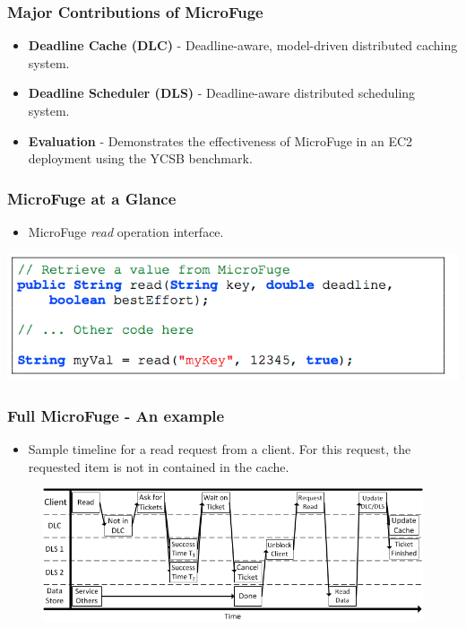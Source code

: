 \documentclass{beamer}
\begin{document}
\begin{frame}
  \frametitle{Major Contributions of MicroFuge}
  \begin{itemize}
    \item \textbf{Deadline Cache (DLC)} - Deadline-aware, model-driven distributed
      caching system.
    \item \textbf{Deadline Scheduler (DLS)} - Deadline-aware distributed scheduling system.
    \item \textbf{Evaluation} - Demonstrates the effectiveness of MicroFuge in
      an EC2 deployment using the YCSB benchmark.
  \end{itemize}
\end {frame}



\begin{frame}
  \frametitle{MicroFuge at a Glance}
  \begin{itemize}
    \item MicroFuge \textit{read} operation interface.
  \end{itemize}
    \includegraphics[scale=0.40]{img/MicroFuge_protocol.png}

\end{frame}


\begin{frame}
  \frametitle{Full MicroFuge - An example}
  \begin{itemize}
    \item Sample timeline for a read request from a client. For this request,
      the requested item is not in contained in the cache.
  \end{itemize}

  \begin{figure}
    \begin{center}
      \centerline{\includegraphics[scale=0.60]{img/RequestTimelineHorizontal.png}}
    \end{center}
  \end{figure}
\end {frame}
\end{document}
